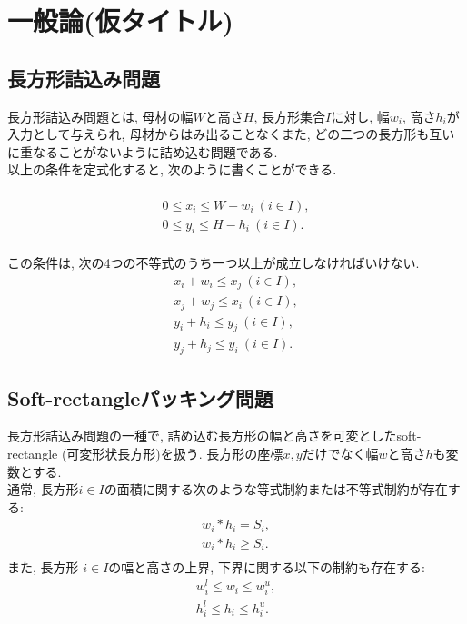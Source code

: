 \section{一般論(仮タイトル)}

\subsection{長方形詰込み問題}
長方形詰込み問題とは, 母材の幅$W$と高さ$H$, 長方形集合$I$に対し, 幅$w_i$, 高さ$h_i$が入力として与えられ, 母材からはみ出ることなくまた, どの二つの長方形も互いに重なることがないように詰め込む問題である. \\
以上の条件を定式化すると, 次のように書くことができる. \\
\\
\begin{eqnarray}
    0 \leq x_i \leq W-w_i \ (i \in I), \\
    0 \leq y_i \leq H-h_i \ (i \in I). 
\end{eqnarray}
\\
この条件は, 次の4つの不等式のうち一つ以上が成立しなければいけない.  
\begin{eqnarray}
    x_i + w_i \leq x_j \ (i \in I), \\
    x_j + w_j \leq x_i \ (i \in I), \\
    y_i + h_i \leq y_j \ (i \in I), \\
    y_j + h_j \leq y_i \ (i \in I). 
\end{eqnarray}

\subsection{Soft-rectangleパッキング問題}
長方形詰込み問題の一種で, 詰め込む長方形の幅と高さを可変としたsoft-rectangle (可変形状長方形)を扱う\cite{soft-rectangle}. 
長方形の座標$x,y$だけでなく幅$w$と高さ$h$も変数とする. \\
通常, 長方形$i \in I$の面積に関する次のような等式制約または不等式制約が存在する: \\
\begin{eqnarray}
    w_i * h_i = S_i, \\
    w_i * h_i \geq S_i. \\
\end{eqnarray}
また, 長方形 $i \in I$の幅と高さの上界, 下界に関する以下の制約も存在する: 
\begin{eqnarray}
    w_i^l \leq w_i \leq w_i^u, \\
    h_i^l \leq h_i \leq h_i^u. 
\end{eqnarray}

